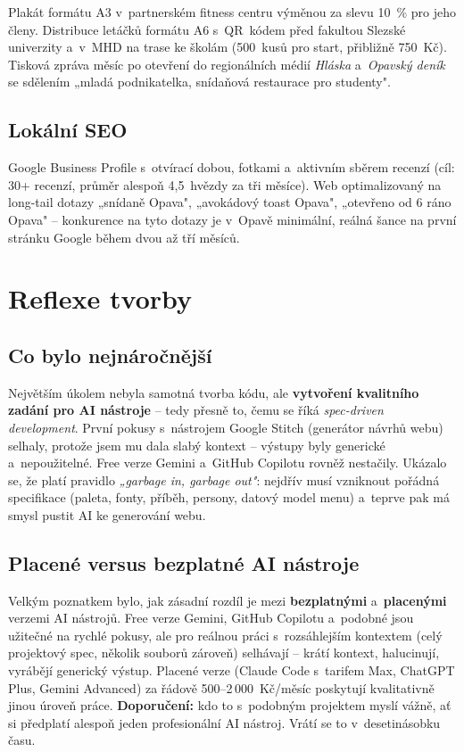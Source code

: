 \documentclass[12pt,a4paper]{article}
\begin{document}
Plakát formátu A3 v~partnerském fitness centru výměnou za slevu 10~\% pro jeho členy. Distribuce letáčků formátu A6 s~QR~kódem před fakultou Slezské univerzity a~v~MHD na trase ke školám (500~kusů pro start, přibližně 750~Kč). Tisková zpráva měsíc po otevření do regionálních médií \emph{Hláska} a~\emph{Opavský deník} se sdělením „mladá podnikatelka, snídaňová restaurace pro studenty".

\subsection{Lokální SEO}

Google Business Profile s~otvírací dobou, fotkami a~aktivním sběrem recenzí (cíl: 30+ recenzí, průměr alespoň 4{,}5~hvězdy za tři měsíce). Web optimalizovaný na long-tail dotazy „snídaně Opava", „avokádový toast Opava", „otevřeno od 6 ráno Opava" -- konkurence na tyto dotazy je v~Opavě minimální, reálná šance na první stránku Google během dvou až tří měsíců.

\section{Reflexe tvorby}

\subsection{Co bylo nejnáročnější}

Největším úkolem nebyla samotná tvorba kódu, ale \textbf{vytvoření kvalitního zadání pro AI nástroje} -- tedy přesně to, čemu se říká \emph{spec-driven development}. První pokusy s~nástrojem Google Stitch (generátor návrhů webu) selhaly, protože jsem mu dala slabý kontext -- výstupy byly generické a~nepoužitelné. Free verze Gemini a~GitHub Copilotu rovněž nestačily. Ukázalo se, že platí pravidlo \emph{„garbage in, garbage out"}: nejdřív musí vzniknout pořádná specifikace (paleta, fonty, příběh, persony, datový model menu) a~teprve pak má smysl pustit AI ke generování webu.

\subsection{Placené versus bezplatné AI nástroje}

Velkým poznatkem bylo, jak zásadní rozdíl je mezi \textbf{bezplatnými} a~\textbf{placenými} verzemi AI nástrojů. Free verze Gemini, GitHub Copilotu a~podobné jsou užitečné na rychlé pokusy, ale pro reálnou práci s~rozsáhlejším kontextem (celý projektový spec, několik souborů zároveň) selhávají -- krátí kontext, halucinují, vyrábějí generický výstup. Placené verze (Claude Code s~tarifem Max, ChatGPT Plus, Gemini Advanced) za řádově 500--2\,000~Kč/měsíc poskytují kvalitativně jinou úroveň práce. \textbf{Doporučení:} kdo to s~podobným projektem myslí vážně, ať si předplatí alespoň jeden profesionální AI nástroj. Vrátí se to v~desetinásobku času.
\end{document}

